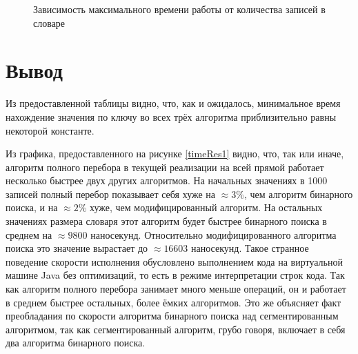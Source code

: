 \documentclass[12pt]{report}
\begin{document}
\begin{figure}[h]
\begin{center}
	\captionsetup{justification=centering}
	\caption{Зависимость максимального времени работы от количества записей в словаре}
	\label{timeRes2}
	\end{center}
\end{figure}

\newpage

\section*{Вывод}
Из предоставленной таблицы видно, что, как и ожидалось, минимальное время нахождение значения по ключу во всех трёх алгоритма приблизительно равны некоторой константе.

Из графика, предоставленного на рисунке \ref{timeRes1} видно, что, так или иначе, алгоритм полного перебора в текущей реализации на всей прямой работает несколько быстрее двух других алгоритмов. На начальных значениях в 1000 записей полный перебор показывает себя хуже на $\approx 3\%$, чем алгоритм бинарного поиска, и на $\approx 2\%$ хуже, чем модифицированный алгоритм. На остальных значениях размера словаря этот алгоритм будет быстрее бинарного поиска в среднем на $\approx 9800$ наносекунд. Относительно модифицированного алгоритма поиска это значение вырастает до $\approx 16603$ наносекунд. Такое странное поведение скорости исполнения обусловлено выполнением кода на виртуальной машине Java \cite{JVM} без оптимизаций, то есть в режиме интерпретации строк кода. Так как алгоритм полного перебора занимает много меньше операций, он и работает в среднем быстрее остальных, более ёмких алгоритмов. Это же объясняет факт преобладания по скорости алгоритма бинарного поиска над сегментированным алгоритмом, так как сегментированный алгоритм, грубо говоря, включает в себя два алгоритма бинарного поиска.
\end{document}
